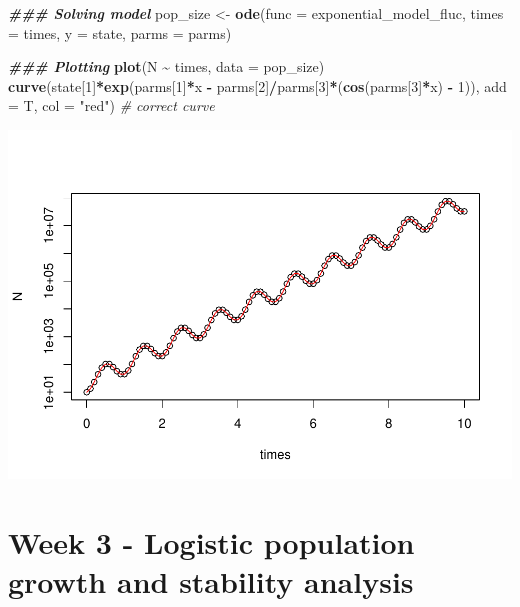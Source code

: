 \documentclass[
]{book}
\newenvironment{Shaded}{\begin{snugshade}}{\end{snugshade}}
\newcommand{\AttributeTok}[1]{\textcolor[rgb]{0.13,0.29,0.53}{#1}}
\newcommand{\CommentTok}[1]{\textcolor[rgb]{0.56,0.35,0.01}{\textit{#1}}}
\newcommand{\DecValTok}[1]{\textcolor[rgb]{0.00,0.00,0.81}{#1}}
\newcommand{\DocumentationTok}[1]{\textcolor[rgb]{0.56,0.35,0.01}{\textbf{\textit{#1}}}}
\newcommand{\FunctionTok}[1]{\textcolor[rgb]{0.13,0.29,0.53}{\textbf{#1}}}
\newcommand{\NormalTok}[1]{#1}
\newcommand{\OtherTok}[1]{\textcolor[rgb]{0.56,0.35,0.01}{#1}}
\newcommand{\SpecialCharTok}[1]{\textcolor[rgb]{0.81,0.36,0.00}{\textbf{#1}}}
\newcommand{\StringTok}[1]{\textcolor[rgb]{0.31,0.60,0.02}{#1}}
\begin{document}
\begin{Shaded}
\begin{Highlighting}[]
\DocumentationTok{\#\#\# Solving model}
\NormalTok{pop\_size }\OtherTok{\textless{}{-}} \FunctionTok{ode}\NormalTok{(}\AttributeTok{func =}\NormalTok{ exponential\_model\_fluc, }\AttributeTok{times =}\NormalTok{ times, }\AttributeTok{y =}\NormalTok{ state, }\AttributeTok{parms =}\NormalTok{ parms)}

\DocumentationTok{\#\#\# Plotting}
\FunctionTok{plot}\NormalTok{(N }\SpecialCharTok{\textasciitilde{}}\NormalTok{ times, }\AttributeTok{data =}\NormalTok{ pop\_size)}
\FunctionTok{curve}\NormalTok{(state[}\DecValTok{1}\NormalTok{]}\SpecialCharTok{*}\FunctionTok{exp}\NormalTok{(parms[}\DecValTok{1}\NormalTok{]}\SpecialCharTok{*}\NormalTok{x }\SpecialCharTok{{-}}\NormalTok{ parms[}\DecValTok{2}\NormalTok{]}\SpecialCharTok{/}\NormalTok{parms[}\DecValTok{3}\NormalTok{]}\SpecialCharTok{*}\NormalTok{(}\FunctionTok{cos}\NormalTok{(parms[}\DecValTok{3}\NormalTok{]}\SpecialCharTok{*}\NormalTok{x) }\SpecialCharTok{{-}} \DecValTok{1}\NormalTok{)), }\AttributeTok{add =}\NormalTok{ T, }\AttributeTok{col =} \StringTok{"red"}\NormalTok{) }\CommentTok{\# correct curve}
\end{Highlighting}
\end{Shaded}

\includegraphics{bookdown-demo_files/figure-latex/unnamed-chunk-11-2.pdf}

\hypertarget{week-3---logistic-population-growth-and-stability-analysis}{%
\chapter*{Week 3 - Logistic population growth and stability analysis}\label{week-3---logistic-population-growth-and-stability-analysis}}
\end{document}
